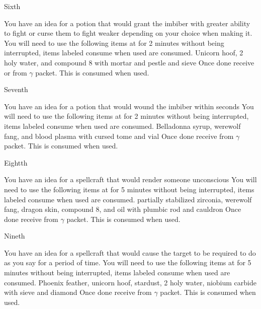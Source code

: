 \documentclass[greennotebook]{guildcamp3} %
\begin{document}
\begin{page}{Sixth}
	
	You have an idea for a potion that would grant the imbiber with greater ability to fight or curse them to fight weaker depending on your choice when making it.
	You will need to use the following items at \sMageWorkbench{} for 2 minutes without being interrupted, items labeled consume when used are consumed.
	Unicorn hoof, 2 holy water, and compound 8 with mortar and pestle and sieve
	Once done receive \iCRUpPotion{} or \iCRDownPotion{} from $\gamma$ packet. This is consumed when used. 
	
\end{page}

\begin{page}{Seventh}
	
	You have an idea for a potion that would wound the imbiber within seconds
	You will need to use the following items at \sMageWorkbench{} for 2 minutes without being interrupted, items labeled consume when used are consumed.
	Belladonna syrup, werewolf fang, and blood plasma with cursed tome and vial
	Once done receive \iMagicPoison{} from $\gamma$ packet. This is consumed when used. 
	
\end{page}

\begin{page}{Eightth}
	
	You have an idea for a spellcraft that would render someone unconscious
	You will need to use the following items at \sMageWorkbench{} for 5 minutes without being interrupted, items labeled consume when used are consumed.
	partially stabilized zirconia, werewolf fang, dragon skin, compound 8, and oil with plumbic rod and cauldron
	Once done receive \iKOSpell{} from $\gamma$ packet. This is consumed when used. 
	
\end{page}

\begin{page}{Nineth}
	
	You have an idea for a spellcraft that would cause the target to be required to do as you say for a period of time.
	You will need to use the following items at \sMageWorkbench{} for 5 minutes without being interrupted, items labeled consume when used are consumed.
	Phoenix feather, unicorn hoof, stardust, 2 holy water, niobium carbide with sieve and diamond
	Once done receive \iMCSpell{} from $\gamma$ packet. This is consumed when used. 
	
\end{page}
\end{document}
